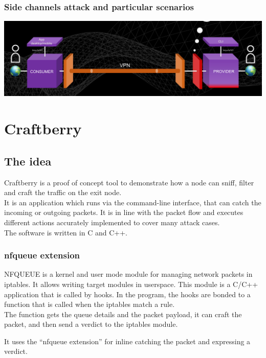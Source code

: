 \documentclass[]{article}
\begin{document}
	\subsubsection{Side channels attack and particular scenarios}


	\includegraphics[width=\linewidth]{"images/client_server_vpn_connection.png"}


	\section{Craftberry}

	\subsection{The idea}
	Craftberry is a proof of concept tool to demonstrate how a node can sniff, filter and craft the traffic on the exit node.\\
	It is an application which runs via the command-line interface, that can catch the incoming or outgoing packets. It is in line with the packet flow and executes different actions accurately implemented to cover many attack cases.\\

	The software is written in C and C++.\\
	
	\subsubsection{nfqueue extension}
	NFQUEUE is a kernel and user mode module for managing network packets in iptables. It allows writing  target modules in userspace. This module is a C/C++ application that is called by  hooks. In the program, the hooks are bonded to a function that is called when the iptables match a rule.\\
	The function gets the queue details and the packet payload, it can craft the packet, and then send a verdict to the iptables module. 

	It uses the  ``nfqueue extension'' for inline catching the packet and expressing a verdict.\\
\end{document}
